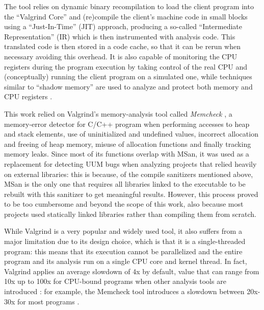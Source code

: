 The tool relies on dynamic binary recompilation to load the client program into the ``Valgrind Core'' and (re)compile the client's machine code in small blocks using a ``Just-In-Time'' (JIT) approach, producing a so-called ``Intermediate Representation'' (IR) which is then instrumented with analysis code. This translated code is then stored in a code cache, so that it can be rerun when necessary avoiding this overhead. It is also capable of monitoring the CPU registers during the program execution by taking control of the real CPU and (conceptually) running the client program on a simulated one, while techniques similar to ``shadow memory'' are used to analyze and protect both memory and CPU registers \cite{Valgrind_1} \cite{Valgrind_2}.

This work relied on Valgrind's memory-analysis tool called \textit{Memcheck} \cite{memcheck_docs}\cite{memcheck_paper}, a memory-error detector for C/C++ program when performing accesses to heap and stack elements, use of uninitialized and undefined values, incorrect allocation and freeing of heap memory, misuse of allocation functions and finally tracking memory leaks. Since most of its functions overlap with MSan, it was used as a replacement for detecting UUM bugs when analyzing projects that relied heavily on external libraries: this is because, of the compile sanitizers mentioned above, MSan is the only one that requires all libraries linked to the executable to be rebuilt with this sanitizer to get meaningful results. However, this process proved to be too cumbersome and beyond the scope of this work, also because most projects used statically linked libraries rather than compiling them from scratch.

While Valgrind is a very popular and widely used tool, it also suffers from a major limitation due to its design choice, which is that it is a single-threaded program: this means that its execution cannot be parallelized and the entire program and its analysis run on a single CPU core and kernel thread. In fact, Valgrind applies an average slowdown of 4x by default, value that can range from 10x up to 100x for CPU-bound programs when other analysis tools are introduced \cite{Valgrind_1}: for example, the Memcheck tool introduces a slowdown between 20x-30x for most programs \cite{memcheck_docs}.





\newpage
